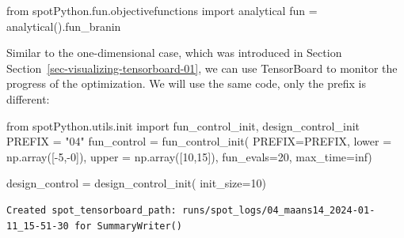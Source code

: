 \documentclass[
  letterpaper,
  DIV=11,
  numbers=noendperiod]{scrreprt}
\newenvironment{Shaded}{\begin{snugshade}}{\end{snugshade}}
\newcommand{\DecValTok}[1]{\textcolor[rgb]{0.68,0.00,0.00}{#1}}
\newcommand{\ImportTok}[1]{\textcolor[rgb]{0.00,0.46,0.62}{#1}}
\newcommand{\NormalTok}[1]{\textcolor[rgb]{0.00,0.23,0.31}{#1}}
\newcommand{\OperatorTok}[1]{\textcolor[rgb]{0.37,0.37,0.37}{#1}}
\newcommand{\StringTok}[1]{\textcolor[rgb]{0.13,0.47,0.30}{#1}}
\begin{document}
\begin{Shaded}
\begin{Highlighting}[]
\ImportTok{from}\NormalTok{ spotPython.fun.objectivefunctions }\ImportTok{import}\NormalTok{ analytical}
\NormalTok{fun }\OperatorTok{=}\NormalTok{ analytical().fun\_branin}
\end{Highlighting}
\end{Shaded}

\begin{tcolorbox}[enhanced jigsaw, left=2mm, opacitybacktitle=0.6, leftrule=.75mm, toptitle=1mm, opacityback=0, colback=white, rightrule=.15mm, colframe=quarto-callout-note-color-frame, title=\textcolor{quarto-callout-note-color}{\faInfo}\hspace{0.5em}{TensorBoard}, toprule=.15mm, coltitle=black, bottomrule=.15mm, bottomtitle=1mm, colbacktitle=quarto-callout-note-color!10!white, titlerule=0mm, breakable, arc=.35mm]

Similar to the one-dimensional case, which was introduced in Section
Section~\ref{sec-visualizing-tensorboard-01}, we can use TensorBoard to
monitor the progress of the optimization. We will use the same code,
only the prefix is different:

\begin{Shaded}
\begin{Highlighting}[]
\ImportTok{from}\NormalTok{ spotPython.utils.init }\ImportTok{import}\NormalTok{ fun\_control\_init, design\_control\_init}
\NormalTok{PREFIX }\OperatorTok{=} \StringTok{"04"}
\NormalTok{fun\_control }\OperatorTok{=}\NormalTok{ fun\_control\_init(}
\NormalTok{    PREFIX}\OperatorTok{=}\NormalTok{PREFIX,}
\NormalTok{    lower }\OperatorTok{=}\NormalTok{ np.array([}\OperatorTok{{-}}\DecValTok{5}\NormalTok{,}\OperatorTok{{-}}\DecValTok{0}\NormalTok{]),}
\NormalTok{    upper }\OperatorTok{=}\NormalTok{ np.array([}\DecValTok{10}\NormalTok{,}\DecValTok{15}\NormalTok{]),}
\NormalTok{    fun\_evals}\OperatorTok{=}\DecValTok{20}\NormalTok{,}
\NormalTok{    max\_time}\OperatorTok{=}\NormalTok{inf)}

\NormalTok{design\_control }\OperatorTok{=}\NormalTok{ design\_control\_init(}
\NormalTok{    init\_size}\OperatorTok{=}\DecValTok{10}\NormalTok{)}
\end{Highlighting}
\end{Shaded}

\begin{verbatim}
Created spot_tensorboard_path: runs/spot_logs/04_maans14_2024-01-11_15-51-30 for SummaryWriter()
\end{verbatim}

\end{tcolorbox}
\end{document}
